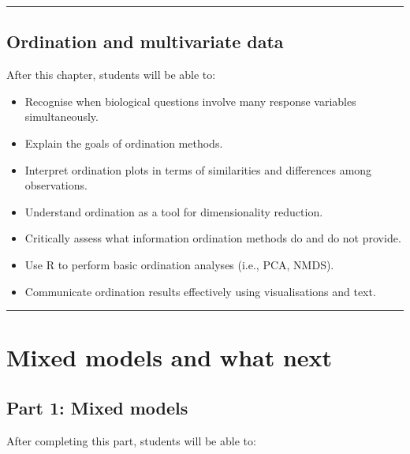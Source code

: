 \documentclass[
  letterpaper,
  8pt,
  a4paper]{book}
\providecommand{\tightlist}{%
  \setlength{\itemsep}{0pt}\setlength{\parskip}{0pt}}
\begin{document}
\begin{center}\rule{0.5\linewidth}{0.5pt}\end{center}

\subsection*{Ordination and multivariate
data}\label{ordination-and-multivariate-data}

After this chapter, students will be able to:

\begin{itemize}
\tightlist
\item
  Recognise when biological questions involve many response variables
  simultaneously.
\item
  Explain the goals of ordination methods.
\item
  Interpret ordination plots in terms of similarities and differences
  among observations.
\item
  Understand ordination as a tool for dimensionality reduction.
\item
  Critically assess what information ordination methods do and do not
  provide.
\item
  Use R to perform basic ordination analyses (i.e., PCA, NMDS).
\item
  Communicate ordination results effectively using visualisations and
  text.
\end{itemize}

\begin{center}\rule{0.5\linewidth}{0.5pt}\end{center}

\section*{Mixed models and what next}\label{mixed-models-and-what-next}


\subsection*{Part 1: Mixed models}\label{part-1-mixed-models}

After completing this part, students will be able to:
\end{document}
